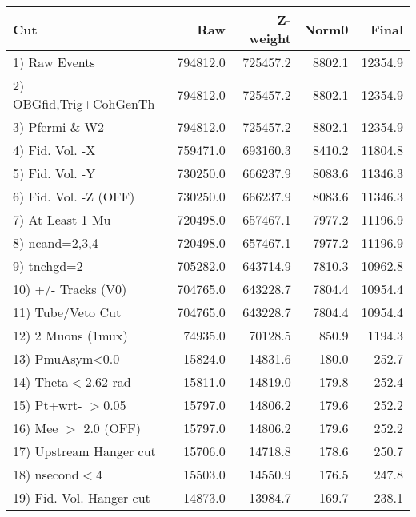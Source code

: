  \begin{table}[h!]\centering
 \begin{tabular}{||l||r|r|r|r||}
 \hline
 \hline
 Cut & Raw & Z-weight & Norm0 & Final \\
 \hline
  1) Raw Events           &    794812.0 &    725457.2 &      8802.1 &     12354.9 \\
  2) OBGfid,Trig+CohGenTh &    794812.0 &    725457.2 &      8802.1 &     12354.9 \\
  3) Pfermi \& W2         &    794812.0 &    725457.2 &      8802.1 &     12354.9 \\
  4) Fid. Vol. -X         &    759471.0 &    693160.3 &      8410.2 &     11804.8 \\
  5) Fid. Vol. -Y         &    730250.0 &    666237.9 &      8083.6 &     11346.3 \\
  6) Fid. Vol. -Z (OFF)   &    730250.0 &    666237.9 &      8083.6 &     11346.3 \\
  7) At Least 1 Mu        &    720498.0 &    657467.1 &      7977.2 &     11196.9 \\
  8) ncand=2,3,4          &    720498.0 &    657467.1 &      7977.2 &     11196.9 \\
  9) tnchgd=2             &    705282.0 &    643714.9 &      7810.3 &     10962.8 \\
 10) +/- Tracks (V0)      &    704765.0 &    643228.7 &      7804.4 &     10954.4 \\
 11) Tube/Veto Cut        &    704765.0 &    643228.7 &      7804.4 &     10954.4 \\
 12) 2 Muons (1mux)       &     74935.0 &     70128.5 &       850.9 &      1194.3 \\
 13) PmuAsym<0.0          &     15824.0 &     14831.6 &       180.0 &       252.7 \\
 14) Theta$<$2.62 rad     &     15811.0 &     14819.0 &       179.8 &       252.4 \\
 15) Pt+wrt- $>$0.05      &     15797.0 &     14806.2 &       179.6 &       252.2 \\
 16) Mee $>$ 2.0  (OFF)   &     15797.0 &     14806.2 &       179.6 &       252.2 \\
 17) Upstream Hanger cut  &     15706.0 &     14718.8 &       178.6 &       250.7 \\
 18) nsecond$<$4          &     15503.0 &     14550.9 &       176.5 &       247.8 \\
 19) Fid. Vol. Hanger cut &     14873.0 &     13984.7 &       169.7 &       238.1 \\

\end{tabular}
\end{table}
